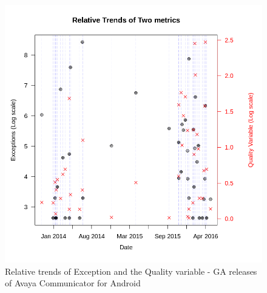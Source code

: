 \documentclass[smallcondensed]{svjour3}     %
\begin{document}
\begin{figure}[!t]
\centering
\includegraphics[width=\linewidth]{trend_ga}
\caption{Relative trends of Exception and the Quality variable - GA releases of Avaya Communicator for Android}
\label{fig:trend_ga}
\vspace{-10pt}
\end{figure}
\end{document}
